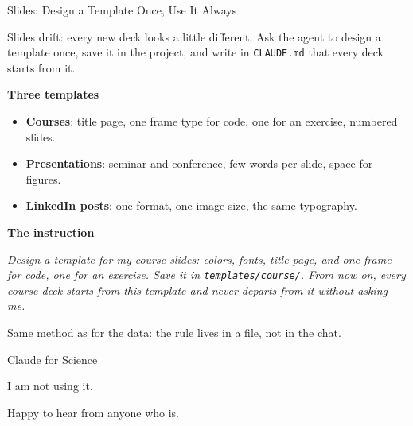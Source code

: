 \documentclass[svgnames,x11names,dvipsnames]{beamer}
\newcommand{\chg}[1]{{\bfseries #1}}
\renewcommand{\chg}[1]{#1}
\begin{document}
\begin{frame}{\chg{Slides: Design a Template Once, Use It Always}}

\small
\chg{Slides drift: every new deck looks a little different. Ask the agent to design a template once, save it in the project, and write in \texttt{CLAUDE.md} that every deck starts from it.}

\vspace{0.3cm}

\textbf{\chg{Three templates}}
\begin{itemize}
    \setlength{\itemsep}{3pt}
    \item \chg{\textbf{Courses}: title page, one frame type for code, one for an exercise, numbered slides.}
    \item \chg{\textbf{Presentations}: seminar and conference, few words per slide, space for figures.}
    \item \chg{\textbf{LinkedIn posts}: one format, one image size, the same typography.}
\end{itemize}

\vspace{0.3cm}

\textbf{\chg{The instruction}}

\vspace{0.1cm}
{\footnotesize \chg{\textit{Design a template for my course slides: colors, fonts, title page, and one frame for code, one for an exercise. Save it in \texttt{templates/course/}. From now on, every course deck starts from this template and never departs from it without asking me.}}}

\vspace{0.3cm}

\chg{Same method as for the data: the rule lives in a file, not in the chat.}

\end{frame}

\begin{frame}{\chg{Claude for Science}}

\centering
\vfill
\Large \chg{I am not using it.}

\vspace{0.6cm}

\normalsize
\chg{Happy to hear from anyone who is.}
\vfill

\end{frame}

\end{document}
